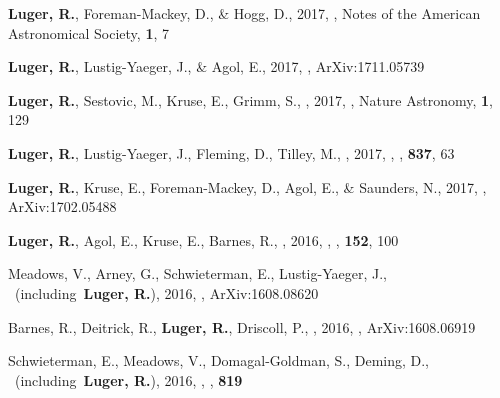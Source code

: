\item[{\color{numcolor}\scriptsize}] \textbf{Luger, R.}, Foreman-Mackey, D., \& Hogg, D., 2017, , Notes of the American Astronomical Society, \textbf{1}, 7

\item[{\color{numcolor}\scriptsize}] \textbf{Luger, R.}, Lustig-Yaeger, J., \& Agol, E., 2017, , ArXiv:1711.05739

\item[{\color{numcolor}\scriptsize15}] \textbf{Luger, R.}, Sestovic, M., Kruse, E., Grimm, S., \etal, 2017, , Nature Astronomy, \textbf{1}, 129

\item[{\color{numcolor}\scriptsize6}] \textbf{Luger, R.}, Lustig-Yaeger, J., Fleming, D., Tilley, M., \etal, 2017, , \apj, \textbf{837}, 63

\item[{\color{numcolor}\scriptsize8}] \textbf{Luger, R.}, Kruse, E., Foreman-Mackey, D., Agol, E., \& Saunders, N., 2017, , ArXiv:1702.05488

\item[{\color{numcolor}\scriptsize35}] \textbf{Luger, R.}, Agol, E., Kruse, E., Barnes, R., \etal, 2016, , \aj, \textbf{152}, 100

\item[{\color{numcolor}\scriptsize21}] Meadows, V., Arney, G., Schwieterman, E., Lustig-Yaeger, J., \etal\ (including\ \textbf{Luger, R.}), 2016, , ArXiv:1608.08620

\item[{\color{numcolor}\scriptsize21}] Barnes, R., Deitrick, R., \textbf{Luger, R.}, Driscoll, P., \etal, 2016, , ArXiv:1608.06919

\item[{\color{numcolor}\scriptsize21}] Schwieterman, E., Meadows, V., Domagal-Goldman, S., Deming, D., \etal\ (including\ \textbf{Luger, R.}), 2016, , \apj, \textbf{819}

